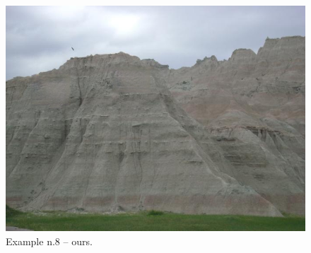\documentclass[a4paper, 11pt]{article}
\begin{document}
\begin{figure}
    \centering
    \includegraphics[width=.95\linewidth]{documentation/img/modified/0084.png}
    \caption{Example n.8 -- ours.}
    \label{img:ex_n.8_mask}
\end{figure}
\end{document}
